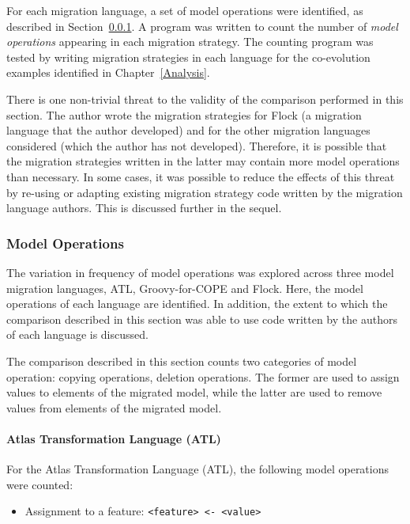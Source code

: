 For each migration language, a set of model operations were identified, as described in Section~\ref{subsubsec:quantitive_model_operations}. A program was written to count the number of \emph{model operations} appearing in each migration strategy. The counting program was tested by writing migration strategies in each language for the co-evolution examples identified in Chapter~\ref{Analysis}.

There is one non-trivial threat to the validity of the comparison performed in this section. The author wrote the migration strategies for Flock (a migration language that the author developed) and for the other migration languages considered (which the author has not developed). Therefore, it is possible that the migration strategies written in the latter may contain more model operations than necessary. In some cases, it was possible to reduce the effects of this threat by re-using or adapting existing migration strategy code written by the migration language authors. This is discussed further in the sequel.

\subsubsection{Model Operations}
\label{subsubsec:quantitive_model_operations}
The variation in frequency of model operations was explored across three model migration languages, ATL, Groovy-for-COPE and Flock. Here, the model operations of each language are identified. In addition, the extent to which the comparison described in this section was able to use code written by the authors of each language is discussed.

The comparison described in this section counts two categories of model operation: copying operations, deletion operations. The former are used to assign values to elements of the migrated model, while the latter are used to remove values from elements of the migrated model.

\paragraph{Atlas Transformation Language (ATL)}
For the Atlas Transformation Language (ATL), the following model operations were counted:
	
\begin{itemize}
	\item Assignment to a feature:
	\subitem \texttt{<feature> <- <value>} 
\end{itemize}

